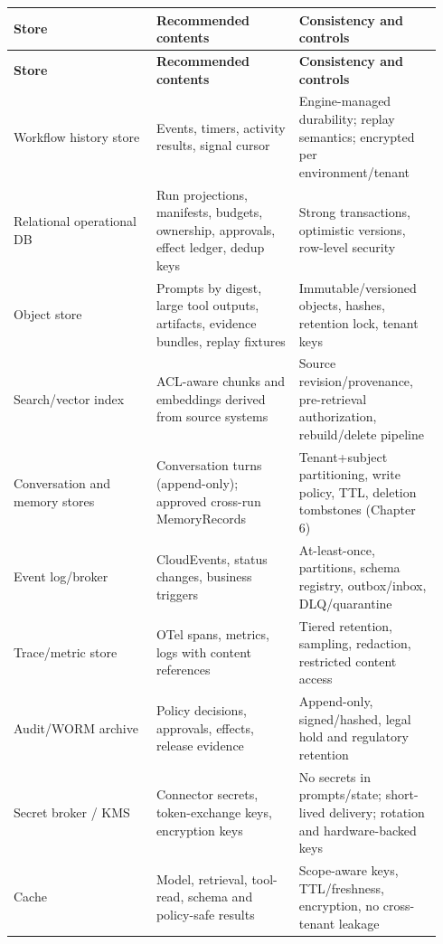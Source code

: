 \BookTableStart
\small
\begin{longtable}{@{}Y{0.3133\linewidth}Y{0.3133\linewidth}Y{0.3133\linewidth}@{}}
\color{white}\bfseries \textbf{Store} & \color{white}\bfseries \textbf{Recommended contents} & \color{white}\bfseries \textbf{Consistency and controls} \\
\endfirsthead
{}
\color{white}\bfseries \textbf{Store} & \color{white}\bfseries \textbf{Recommended contents} & \color{white}\bfseries \textbf{Consistency and controls} \\
\endhead
Workflow history store & Events, timers, activity results, signal cursor & Engine-managed durability; replay semantics; encrypted per environment/tenant \\
Relational operational DB & Run projections, manifests, budgets, ownership, approvals, effect ledger, dedup keys & Strong transactions, optimistic versions, row-level security \\
Object store & Prompts by digest, large tool outputs, artifacts, evidence bundles, replay fixtures & Immutable/versioned objects, hashes, retention lock, tenant keys \\
Search/vector index & ACL-aware chunks and embeddings derived from source systems & Source revision/provenance, pre-retrieval authorization, rebuild/delete pipeline \\
Conversation and memory stores & Conversation turns (append-only); approved cross-run MemoryRecords & Tenant+subject partitioning, write policy, TTL, deletion tombstones (Chapter 6) \\
Event log/broker & CloudEvents, status changes, business triggers & At-least-once, partitions, schema registry, outbox/inbox, DLQ/quarantine \\
Trace/metric store & OTel spans, metrics, logs with content references & Tiered retention, sampling, redaction, restricted content access \\
Audit/WORM archive & Policy decisions, approvals, effects, release evidence & Append-only, signed/hashed, legal hold and regulatory retention \\
Secret broker / KMS & Connector secrets, token-exchange keys, encryption keys & No secrets in prompts/state; short-lived delivery; rotation and hardware-backed keys \\
Cache & Model, retrieval, tool-read, schema and policy-safe results & Scope-aware keys, TTL/freshness, encryption, no cross-tenant leakage \\
\end{longtable}
\BookTableEnd


